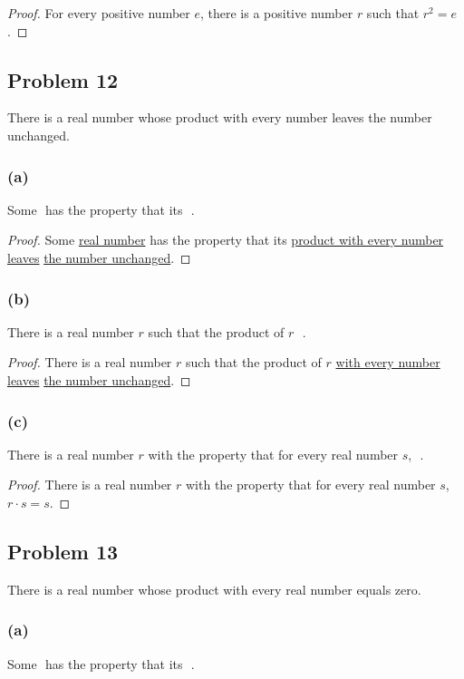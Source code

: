 \documentclass[14pt]{extarticle}
\newcommand{\fbl}{\underline{\hspace{1cm}}\,\,}
\begin{document}
\begin{proof}
    For every positive number $e$, there is a positive number $r$ such that
    \underline{$r^2 = e$}.
\end{proof}

\subsection{Problem 12}
There is a real number whose product with every number leaves the number
unchanged.

\subsubsection{(a)}
Some \fbl has the property that its \fbl.

\begin{proof}
    Some \underline{real number} has the property that its \underline{product with
        every number leaves} \underline{the number unchanged}.
\end{proof}

\subsubsection{(b)}
There is a real number $r$ such that the product of $r$ \fbl.

\begin{proof}
    There is a real number $r$ such that the product of $r$ \underline{with every
        number leaves} \underline{the number unchanged}.
\end{proof}

\subsubsection{(c)}
There is a real number $r$ with the property that for every real number $s$,
\fbl.

\begin{proof}
    There is a real number $r$ with the property that for every real number $s$,
    \underline{$r \cdot s = s$}.
\end{proof}

\subsection{Problem 13}
There is a real number whose product with every real number equals zero.

\subsubsection{(a)}
Some \fbl has the property that its \fbl.
\end{document}
